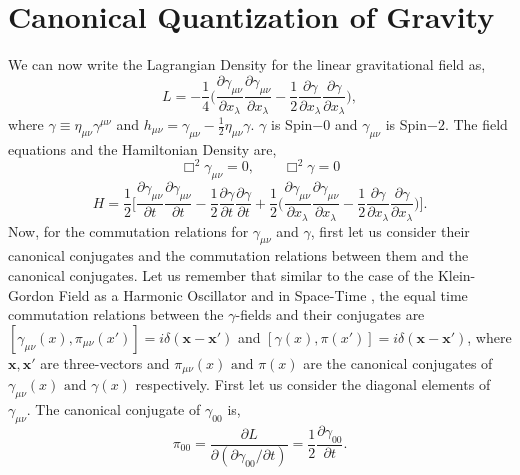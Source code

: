 \documentclass[12pt,a4paper]{report}
\theoremstyle{plain}
\theoremstyle{definition}
\theoremstyle{remark}
\newcommand{\mink}{\eta_{\mu\nu}}
\newcommand{\munu}{\mu\nu}
\begin{document}
\section{Canonical Quantization of Gravity}
We can now write the Lagrangian Density for the linear gravitational field as,
\begin{equation}
    L = -\frac{1}{4}\Bigg(\frac{\partial\gamma_{\munu}}{\partial x_{\lambda}}\frac{\partial\gamma_{\munu}}{\partial x_{\lambda}} - \frac{1}{2}\frac{\partial\gamma}{\partial x_{\lambda}}\frac{\partial\gamma}{\partial x_{\lambda}}\Bigg),
\end{equation}
where $\gamma \equiv \mink \gamma^{\munu}$ and $h_{\munu} = \gamma_{\munu} - \frac{1}{2}\mink\gamma$. $\gamma$ is Spin$-0$ and $\gamma_{\munu}$ is Spin$-2$. The field equations and the Hamiltonian Density are,
\begin{equation}
    \Box^2\gamma_{\munu} = 0,\qquad \Box^2\gamma = 0
\end{equation}
\begin{equation}
    H = \frac{1}{2}\Bigg[\frac{\partial\gamma_{\munu}}{\partial t}\frac{\partial\gamma_{\munu}}{\partial t} - \frac{1}{2}\frac{\partial\gamma}{\partial t}\frac{\partial\gamma}{\partial t} + \frac{1}{2}\Bigg(\frac{\partial\gamma_{\munu}}{\partial x_{\lambda}}\frac{\partial\gamma_{\munu}}{\partial x_{\lambda}} - \frac{1}{2}\frac{\partial\gamma}{\partial x_{\lambda}}\frac{\partial\gamma}{\partial x_{\lambda}}\Bigg)\Bigg].
    \label{eq: HamiltonianDensity}
\end{equation}
Now, for the commutation relations for $\gamma_{\munu}$ and $\gamma$, first let us consider their canonical conjugates and the commutation relations between them and the canonical conjugates. Let us remember that similar to the case of the Klein-Gordon Field as a Harmonic Oscillator and in Space-Time \cite{Peskin}, the equal time commutation relations between the $\gamma$-fields and their conjugates are $[\gamma_{\munu}(x), \pi_{\munu}(x')] = i\delta(\bm{x} - \bm{x'})$ and $[\gamma(x), \pi(x')] = i\delta(\bm{x} - \bm{x'})$, where $\bm{x}, \bm{x'}$ are three-vectors and $\pi_{\munu}(x) \text{ and } \pi(x)$ are the canonical conjugates of $\gamma_{\munu}(x) \text{ and } \gamma(x)$ respectively. First let us consider the diagonal elements of $\gamma_{\munu}$.
The canonical conjugate of $\gamma_{00}$ is,
\begin{equation}
    \pi_{00} = \frac{\partial L}{\partial (\partial \gamma_{00}/\partial t)} = \frac{1}{2}\frac{\partial \gamma_{00}}{\partial t}.
\end{equation}
\end{document}
